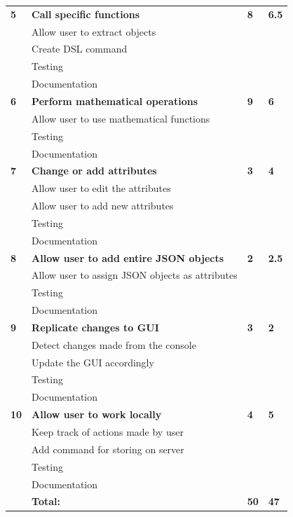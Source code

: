 \begin{table}
\begin{tabular}{ l p{8cm} l l }
 \bf{5}	  &\bf{Call specific functions}					&\bf{8}		&\bf{6.5}		     \\
		  &Allow user to extract objects				&			&		\\
		  &Create DSL command						&			&		\\
		  &Testing								&			&		\\
		  &Documentation							&			&		\\

\bf{6}	  &\bf{Perform mathematical operations}			&\bf{9}		&\bf{6}		     \\
		  &Allow user to use mathematical functions		&			&		\\
		  &Testing								&			&		\\
		  &Documentation							&			&		\\

\bf{7}   	&\bf{Change or add attributes}				&\bf{3}		&\bf{4}		     \\ 
		  &Allow user to edit the attributes				&			&		\\
		  &Allow user to add new attributes				&			&		\\
		  &Testing								&			&		\\
		  &Documentation							&			&		\\

\bf{8}   	&\bf{Allow user to add entire JSON objects}			&\bf{2}		&\bf{2.5}		     \\ 
		  &Allow user to assign JSON objects as attributes		&			&		\\
		  &Testing									&			&		\\
		  &Documentation								&			&		\\

\bf{9}   	&\bf{Replicate changes to GUI}				&\bf{3}		&\bf{2}		     \\ 
		  &Detect changes made from the console		&			&		\\
		  &Update the GUI accordingly					&			&		\\
		  &Testing								&			&		\\
		  &Documentation							&			&		\\

\bf{10}   	&\bf{Allow user to work locally}				&\bf{4}		&\bf{5}		     \\ 
		  &Keep track of actions made by user			&			&		\\
		  &Add command for storing on server			&			&		\\
		  &Testing								&			&		\\
		  &Documentation							&			&		\\

\hline 
		  &\bf{Total:}						&\bf{50}		&\bf{47}		\\
\hline
\end{tabular}
\label{table:sp3backlog}
\end{table}



